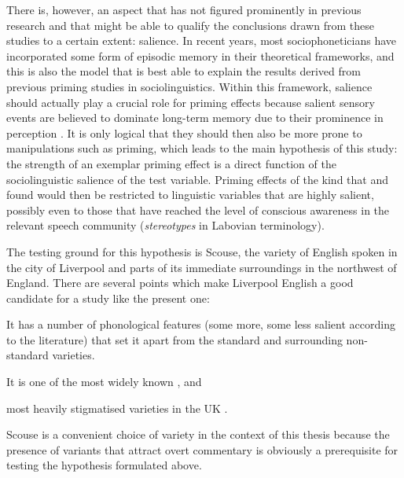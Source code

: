 There is, however, an aspect that has not figured prominently in previous research and that might be able to qualify the conclusions drawn from these studies to a certain extent: salience.
In recent years, most sociophoneticians have incorporated some form of episodic memory in their theoretical frameworks, and this is also the model that is best able to explain the results derived from previous priming studies in sociolinguistics.
Within this framework, salience should actually play a crucial role for priming effects because salient sensory events are believed to dominate long-term memory due to their prominence in perception \parencite[cf.][]{pierrehumbert2006}.
It is only logical that they should then also be more prone to manipulations such as priming, which leads to the main hypothesis of this study: the strength of an exemplar priming effect is a direct function of the sociolinguistic salience of the test variable.
Priming effects of the kind that \citeauthor{niedzielski1999} and \citeauthor{hayetal2006a} found would then be restricted to linguistic variables that are highly salient, possibly even to those that have reached the level of conscious awareness in the relevant speech community (\emph{stereotypes} in Labovian terminology).

The testing ground for this hypothesis is Scouse, the variety of English spoken in the city of Liverpool and parts of its immediate surroundings in the northwest of England.
There are several points which make Liverpool English a good candidate for a study like the present one:
\begin{inparaenum}[(1)]
	\item It has a number of phonological features (some more, some less salient according to the literature) that set it apart from the standard and surrounding non-standard varieties.
	\item It is one of the most widely known \parencite[cf.][]{trudgill1999}, and
	\item most heavily stigmatised varieties in the UK \parencite[cf.][]{montgomery2007}.
\end{inparaenum}
Scouse is a convenient choice of variety in the context of this thesis because the presence of variants that attract overt commentary is obviously a prerequisite for testing the hypothesis formulated above.

